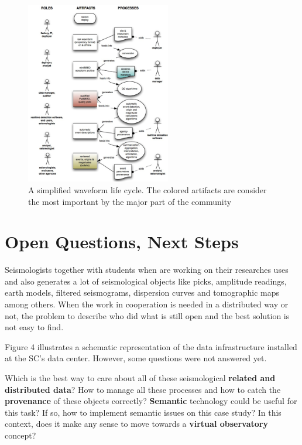 \documentclass[twoside,letterpaper,twocolumn]{article}
\begin{document}
\begin{figure}[ht!]
\centering
\includegraphics[height=8cm]{images/dataSteps.png}
\caption[Figure 3]{A simplified waveform life cycle. The colored artifacts are consider the most important by the major part of the community}
\end{figure}

\section{Open Questions, Next Steps}

Seismologists together with students when are working on their researches uses and also generates a lot of seismological objects like picks, amplitude readings, earth models, filtered seismograms, dispersion curves and tomographic maps among others. When the work in cooperation is needed in a distributed way or not, the problem to describe who did what is still open and the best solution is not easy to find. 

Figure 4 illustrates a schematic representation of the data infrastructure installed at the SC's data center. However, some questions were not answered yet.

Which is the best way to care about all of these seismological \textbf {related and distributed data}? How to manage all these processes and how to catch the \textbf {provenance} of these objects correctly? \textbf {Semantic} technology could be useful for this task? If so, how to implement semantic issues on this case study? In this context, does it make any sense to move towards a \textbf {virtual observatory} concept?
\end{document}
